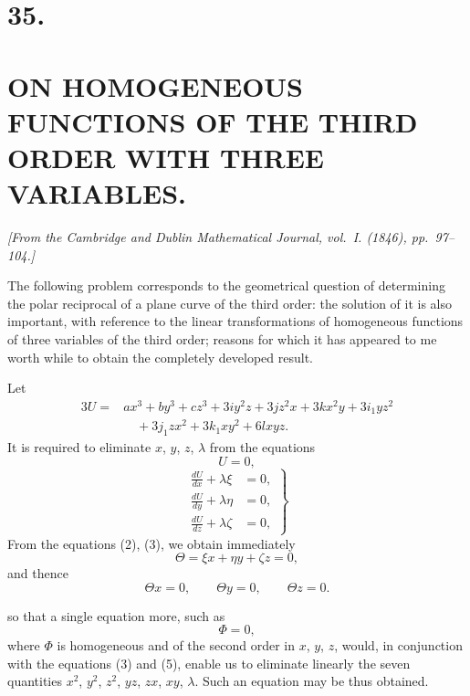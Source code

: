 \documentclass[11pt]{article}
\begin{document}
\newpage
\section*{35.}
\section*{ON HOMOGENEOUS FUNCTIONS OF THE THIRD ORDER WITH THREE VARIABLES.}
\setcounter{page}{230}

\textit{[From the Cambridge and Dublin Mathematical Journal, vol.~I. (1846), pp.~97--104.]}

\bigskip

The following problem corresponds to the geometrical question of determining the
polar reciprocal of a plane curve of the third order: the solution of it is also important,
with reference to the linear transformations of homogeneous functions of three variables
of the third order; reasons for which it has appeared to me worth while to obtain the
completely developed result.

Let
\[
\begin{aligned}
3U={}&ax^3+by^3+cz^3+3iy^2z+3jz^2x+3kx^2y+3i_1yz^2\\
&\quad{}+3j_1zx^2+3k_1xy^2+6lxyz .
\end{aligned}\tag{1}
\]
It is required to eliminate $x$, $y$, $z$, $\lambda$ from the equations
\[
U=0,\tag{2}
\]
\[
\left.
\begin{aligned}
\frac{dU}{dx}+\lambda\xi&=0,\\
\frac{dU}{dy}+\lambda\eta&=0,\\
\frac{dU}{dz}+\lambda\zeta&=0,
\end{aligned}
\right\}\tag{3}
\]
From the equations (2), (3), we obtain immediately
\[
\Theta=\xi x+\eta y+\zeta z=0,\tag{4}
\]
and thence
\[
\Theta x=0,\qquad \Theta y=0,\qquad \Theta z=0.\tag{5}
\]

\newpage
\setcounter{page}{231}

so that a single equation more, such as
\[
\Phi=0,\tag{6}
\]
where $\Phi$ is homogeneous and of the second order in $x$, $y$, $z$, would, in
conjunction with the equations (3) and (5), enable us to eliminate linearly the seven
quantities $x^2$, $y^2$, $z^2$, $yz$, $zx$, $xy$, $\lambda$. Such an equation may be
thus obtained.
\end{document}
